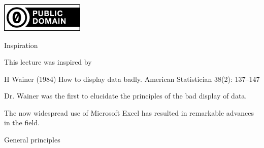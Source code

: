 \documentclass[12pt]{article}
\newcommand{\headsize}{\fontsize{35}{35} \selectfont}
\newcommand{\smallsize}{\fontsize{25}{30} \selectfont}
\newcommand{\smallersize}{\fontsize{20}{25} \selectfont}
\begin{document}
\vfill \hfill
\href{http://creativecommons.org/publicdomain/zero/1.0/}{\includegraphics[height=14mm]{Figs/cc-zero.png}}

\newpage

\headsize \color{myyellow}
\hfill 
\begin{minipage}{5.75in}
\centering
Inspiration
\end{minipage}

\vspace{30mm}

\color{mywhite}
\smallsize

\hspace{0.5in} \begin{minipage}{9in}
This lecture was inspired by

\vspace{10mm}

\hfill \begin{minipage}{8.5in}
{\smallersize \color{myblue}
H Wainer (1984) How to display data badly. American Statistician
38(2): 137--147}
\end{minipage}

\vspace{20mm}

Dr. Wainer was the first to elucidate the principles of the bad
display of data.

\vspace{20mm}

The now widespread use of {\color{mypink} Microsoft Excel} has
resulted in remarkable advances in the field.
\end{minipage}

\newpage

\headsize \color{myyellow}
\hfill \begin{minipage}{5.75in}
\centering
General principles
\end{minipage}

\vspace{10mm}
\smallsize \color{mywhite}
\end{document}

